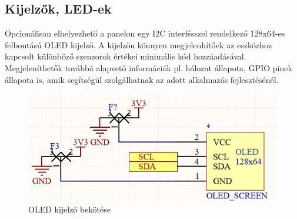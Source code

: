 \subsection{Kijelzők, LED-ek}
Opcionálisan elhelyezhető a panelon egy I2C interfésszel rendelkező 128x64-es felbontású OLED kijelző. A kijelzőn könnyen megjelenhítőek az eszközhoz kapcsolt különböző szenzorok értékei minimális kód hozzáadásával. Megjeleníthetők továbbá alapvető információk pl. hálozat állapota, GPIO pinek állapota is, amik segítségül szolgálhatnak az adott alkalmazás fejlesztésénél.
\begin{figure}[!ht]
    \centering
    \includegraphics[width=120mm, keepaspectratio]{figures/display.png}
    \caption{OLED kijelző bekötése}
    \label{fig:TeXstudio}
\end{figure}

